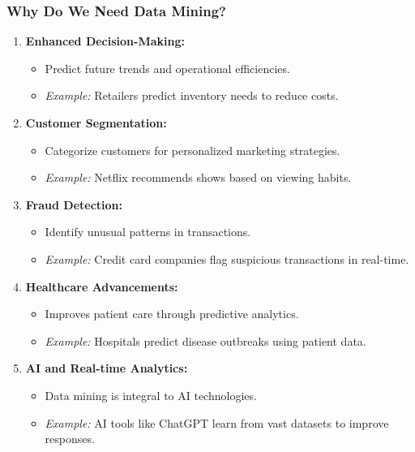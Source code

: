 \documentclass[aspectratio=169]{beamer}
\begin{document}
\begin{frame}[fragile]
    \frametitle{Why Do We Need Data Mining?}
    \begin{enumerate}
        \item \textbf{Enhanced Decision-Making:}
        \begin{itemize}
            \item Predict future trends and operational efficiencies.
            \item \textit{Example:} Retailers predict inventory needs to reduce costs.
        \end{itemize}

        \item \textbf{Customer Segmentation:}
        \begin{itemize}
            \item Categorize customers for personalized marketing strategies.
            \item \textit{Example:} Netflix recommends shows based on viewing habits.
        \end{itemize}

        \item \textbf{Fraud Detection:}
        \begin{itemize}
            \item Identify unusual patterns in transactions.
            \item \textit{Example:} Credit card companies flag suspicious transactions in real-time.
        \end{itemize}

        \item \textbf{Healthcare Advancements:}
        \begin{itemize}
            \item Improves patient care through predictive analytics.
            \item \textit{Example:} Hospitals predict disease outbreaks using patient data.
        \end{itemize}
        
        \item \textbf{AI and Real-time Analytics:}
        \begin{itemize}
            \item Data mining is integral to AI technologies.
            \item \textit{Example:} AI tools like ChatGPT learn from vast datasets to improve responses.
        \end{itemize}
    \end{enumerate}
\end{frame}
\end{document}
